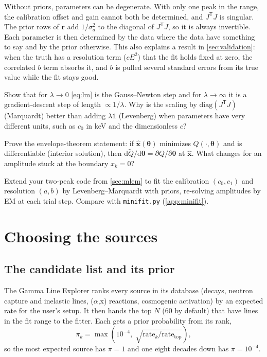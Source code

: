 \documentclass[11pt]{article}
\newcounter{exercise}[section]
\newcommand{\dd}{\mathrm{d}}
\newcommand{\T}{^{\mathsf{T}}}
\newcommand{\vth}{\bm{\theta}}
\newcommand{\vx}{\bm{x}}
\newcommand{\code}[1]{\texttt{#1}}
\begin{document}
\begin{keyidea}
Without priors, parameters can be degenerate. With only one peak in the range, the calibration offset and gain cannot both be determined, and $J\T J$ is singular. The prior rows of $\bm r$ add $1/\sigma_a^2$ to the diagonal of $J\T J$, so it is always invertible. Each parameter is then determined by the data where the data have something to say and by the prior otherwise. This also explains a result in \cref{sec:validation}: when the truth has a resolution term ($cE^2$) that the fit holds fixed at zero, the correlated $b$ term absorbs it, and $b$ is pulled several standard errors from its true value while the fit stays good.
\end{keyidea}

\begin{exercise}[A]
Show that for $\lambda\to0$ \cref{eq:lm} is the Gauss--Newton step and for $\lambda\to\infty$ it is a gradient-descent step of length $\propto1/\lambda$. Why is the scaling by $\mathrm{diag}(J\T J)$ (Marquardt) better than adding $\lambda\mathbb 1$ (Levenberg) when parameters have very different units, such as $c_0$ in keV and the dimensionless $c$?
\end{exercise}

\begin{exercise}[A]
Prove the envelope-theorem statement: if $\hat{\vx}(\vth)$ minimizes $Q(\cdot,\vth)$ and is differentiable (interior solution), then $\dd\tilde Q/\dd\vth = \partial Q/\partial\vth$ at $\hat{\vx}$. What changes for an amplitude stuck at the boundary $x_k=0$?
\end{exercise}

\begin{exercise}[P]
Extend your two-peak code from \cref{sec:mlem} to fit the calibration $(c_0,c_1)$ and resolution $(a,b)$ by Levenberg--Marquardt with priors, re-solving amplitudes by EM at each trial step. Compare with \code{minifit.py} (\cref{app:minifit}).
\end{exercise}

\section{Choosing the sources}\label{sec:selection}
\subsection{The candidate list and its prior}
The Gamma Line Explorer ranks every source in its database (decays, neutron capture and inelastic lines, ($\alpha$,x) reactions, cosmogenic activation) by an expected rate for the user's setup. It then hands the top $N$ (60 by default) that have lines in the fit range to the fitter. Each gets a prior probability from its rank,
\begin{equation}
\pi_k = \max\!\left(10^{-4},\;\sqrt{\text{rate}_k/\text{rate}_\text{top}}\right),
\end{equation}
so the most expected source has $\pi=1$ and one eight decades down has $\pi = 10^{-4}$.
\end{document}
